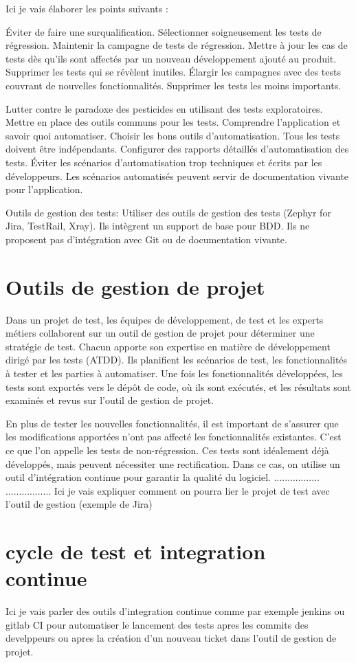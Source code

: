 Ici je vais élaborer les points suivants \parencite{cftl} :


Éviter de faire une surqualification.
Sélectionner soigneusement les tests de régression.
Maintenir la campagne de tests de régression.
Mettre à jour les cas de tests dès qu'ils sont affectés par un nouveau développement ajouté au produit.
Supprimer les tests qui se révèlent inutiles.
Élargir les campagnes avec des tests couvrant de nouvelles fonctionnalités.
Supprimer les tests les moins importants.


Lutter contre le paradoxe des pesticides en utilisant des tests exploratoires.
Mettre en place des outils communs pour les tests.
Comprendre l'application et savoir quoi automatiser.
Choisir les bons outils d'automatisation.
Tous les tests doivent être indépendants.
Configurer des rapports détaillés d'automatisation des tests.
Éviter les scénarios d'automatisation trop techniques et écrits par les développeurs.
Les scénarios automatisés peuvent servir de documentation vivante pour l'application.

Outils de gestion des tests:
Utiliser des outils de gestion des tests (Zephyr for Jira, TestRail, Xray).
Ils intègrent un support de base pour BDD.
Ils ne proposent pas d'intégration avec Git ou de documentation vivante.


\section{Outils de gestion de projet}
\label{sec:outils}
Dans un projet de test, les équipes de développement, de test et les experts métiers collaborent sur un outil de gestion de projet pour déterminer une stratégie de test. Chacun apporte son expertise en matière de développement dirigé par les tests (ATDD). Ils planifient les scénarios de test, les fonctionnalités à tester et les parties à automatiser. Une fois les fonctionnalités développées, les tests sont exportés vers le dépôt de code, où ils sont exécutés, et les résultats sont examinés et revus sur l'outil de gestion de projet.

En plus de tester les nouvelles fonctionnalités, il est important de s'assurer que les modifications apportées n'ont pas affecté les fonctionnalités existantes. C'est ce que l'on appelle les tests de non-régression. Ces tests sont idéalement déjà développés, mais peuvent nécessiter une rectification. Dans ce cas, on utilise un outil d'intégration continue pour garantir la qualité du logiciel.
.................
................. Ici je vais expliquer comment on pourra lier le projet de test avec l'outil de gestion (exemple de Jira)

\section{cycle de test et integration continue}

Ici je vais parler des outils d'integration continue comme par exemple jenkins ou gitlab CI pour automatiser le lancement des tests apres les commits des develppeurs ou apres la création d'un nouveau ticket dans l'outil de gestion de projet.
